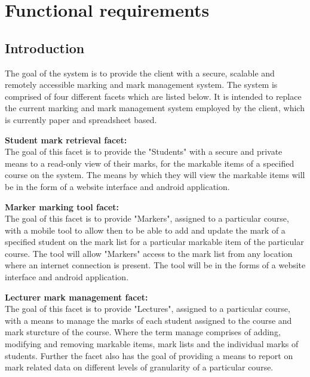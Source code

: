 \documentclass[12pt]{article}
\begin{document}
		\vspace{0.05in}
		
	
	\section{Functional requirements}
	
		\vspace{0.2in}
		
		\subsection{Introduction}
			\begin{flushleft}
				\vspace{0.2in}
	
				The goal of the system is to provide the client with a secure, scalable and remotely accessible marking and mark management system. The system is comprised of four different facets which are listed below. It is intended to replace the current marking and mark management system employed by the client, which is currently paper and spreadsheet based.
				
				\vspace{0.5cm}
				\textbf{Student mark retrieval facet:}
				\vspace{0.1in}
				\\
				The goal of this facet is to provide the "Students" with a secure and private means to a read-only view of their marks, for the markable items of a specified course on the system. The means by which they will view the markable items will be in the form of a website interface and android application.
				
				\vspace{0.5cm}
				\textbf{Marker marking tool facet:}
				\vspace{0.1in}
				\\
				The goal of this facet is to provide "Markers", assigned to a particular course, with a mobile tool to allow then to be able to add and update the mark of a specified student on the mark list for a particular markable item of the particular course. The tool will allow "Markers" access to the mark list from any location where an internet connection is present. The tool will be in the forms of a website interface and android application.
				
				\vspace{0.5cm}
				\textbf{Lecturer mark management facet:}
				\vspace{0.1in}
				\\
				The goal of this facet is to provide "Lectures", assigned to a particular course, with a means to manage the marks of each student assigned to the course and mark sturcture of the course. Where the term manage comprises of adding, modifying and removing markable items, mark lists and the individual marks of students. Further the facet also has the goal of providing a means to report on mark related data on different levels of granularity of a particular course.
				

\end{flushleft}
\end{document}
